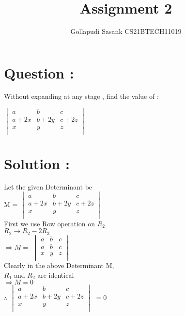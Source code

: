 \documentclass[twocolumn]{article}
\title{Assignment 2}
\author{Gollapudi Sasank CS21BTECH11019}
\newcommand{\mydet}[1]{\ensuremath{\begin{vmatrix}#1\end{vmatrix}}}
\begin{document}
\maketitle
\section*{Question : }
Without expanding at any stage , find the value of : \\
\begin{center}
\mydet{a & b & c \\
a+2x & b+2y & c+2z \\
x & y & z \\}
\end{center}
\section*{Solution :}
Let the given Determinant be\\
M = 
\mydet{a & b & c \\
a+2x & b+2y & c+2z \\
x & y & z \\}\\
First we use Row operation on $R_2$ \\
$ R_2 \rightarrow R_2 - 2R_3 $ \\ 
$\Rightarrow M =$ 
\mydet{a & b & c \\
a & b & c \\
x & y & z \\} \\
Clearly in the above Determinant M,\\
$R_1$ and $R_2$ are identical \\ 
$\Rightarrow M = 0$ \\ 
$\therefore $
\mydet{a & b & c\\
a+2x & b+2y & c+2z \\
x & y & z \\}
$ = 0 $ 
\end{document}
